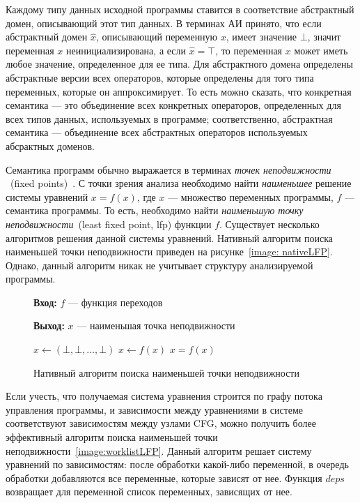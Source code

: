 Каждому типу данных исходной программы ставится в соответствие абстрактный
домен, описывающий этот тип данных. В терминах АИ принято, что если абстрактный
домен $\hat{x}$, описывающий переменную $x$, имеет значение $\bot$, значит 
переменная $x$ неинициализирована, а если $\hat{x} = \top$, то переменная $x$
может иметь любое значение, определенное для ее типа. Для абстрактного домена
определены абстрактные версии всех операторов, которые определены для того
типа переменных, которые он аппроксимирует. То есть можно сказать, что 
конкретная семантика --- это объединение всех конкретных операторов, 
определенных для всех типов данных, используемых в программе; соответственно,
абстрактная семантика --- объединение всех абстрактных операторов используемых 
абсрактных доменов.

Семантика программ обычно выражается в терминах \emph{точек неподвижности}
~(fixed points)~\cite{fixedPoint}. С точки зрения анализа необходимо найти
\emph{наименьшее} решение системы уравнений $x = f(x)$, где $x$ --- множество
переменных программы, $f$ --- семантика программы. То есть, необходимо найти
\emph{наименьшую точку неподвижности}~(least fixed point, lfp) функции $f$.
Существует несколько алгоритмов решения данной системы уравнений. Нативный
алгоритм поиска наименьшей точки неподвижности приведен на рисунке~\ref{image:
nativeLFP}. Однако, данный алгоритм никак не учитывает структуру анализируемой
программы.

\begin{figure}[h!]
\textbf{Вход:} $f$ --- функция переходов

\textbf{Выход:} $x$ --- наименьшая точка неподвижности

\begin{algorithmic} 
\State $x \gets (\bot, \bot, \ldots, \bot)$ 
\Repeat 
	\State $x \gets f(x)$ 
\Until $x = f(x)$ 
\end{algorithmic}

\caption{Нативный алгоритм поиска наименьшей точки неподвижности}
\label{image:nativeLFP}
\end{figure}

Если учесть, что получаемая система уравнения строится по графу потока 
управления программы, и зависимости между уравнениями в системе соответствуют
зависимостям между узлами CFG, можно получить более эффективный алгоритм поиска
наименьшей точки неподвижности~\ref{image:worklistLFP}. Данный алгоритм решает
систему уравнений по зависимостям: после обработки какой-либо переменной,
в очередь обработки добавляются все переменные, которые зависят от нее. Функция
$deps$ возвращает для переменной список переменных, зависящих от нее.

